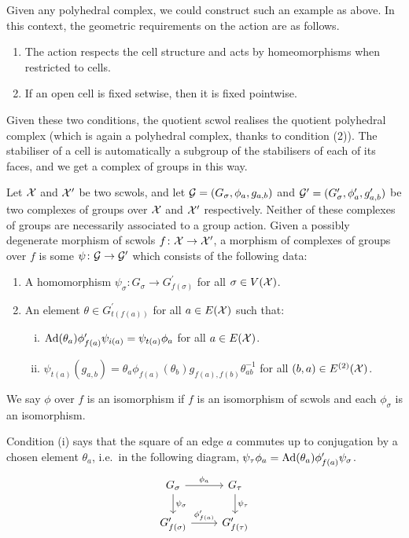 Given any polyhedral complex, we could construct such an example as above.
In this context, the geometric requirements on the action are as follows.
\begin{enumerate}
	\item The action respects the cell structure and acts by homeomorphisms when restricted to cells.
	\item If an open cell is fixed setwise, then it is fixed pointwise.
\end{enumerate}
Given these two conditions, the quotient scwol realises the quotient polyhedral complex (which is again a polyhedral complex, thanks to condition (2)).
The stabiliser of a cell is automatically a subgroup of the stabilisers of each of its faces, and we get a complex of groups in this way.

\begin{definition}
	Let $\mathcal{X}$ and $\mathcal{X}^\prime$ be two scwols, and let $\mathcal{G} = (G_\sigma, \phi_a, g_{a,b})$ and  $\mathcal{G}^\prime = (G^\prime_\sigma, \phi^\prime_a, g^\prime_{a,b})$ be two complexes of groups over $\mathcal{X}$ and $\mathcal{X}^\prime$ respectively.
	Neither of these complexes of groups are necessarily associated to a group action.
	Given a possibly degenerate morphism of scwols $f \colon \mathcal{X} \to \mathcal{X}^\prime$, a morphism of complexes of groups over $f$ is some $\psi  \colon \mathcal{G} \to \mathcal{G}^\prime$ which consists of the following data:
	\begin{enumerate}
		\item A homomorphism $\psi_\sigma \colon G_\sigma \to G^\prime_{f(\sigma)}$ for all $\sigma \in V(\mathcal{X}) $.
		\item An element $\theta \in G^\prime_{t(f(a))}$ for all $a \in E(\mathcal{X})$ such that:
		      \begin{enumerate}[(i)]
			      \item $\operatorname{Ad}(\theta_a)\phi'_{f(a)}\psi_{i(a)}=\psi_{t(a)}\phi_a$ for all $a \in E(\mathcal{X})$.
			      \item $\psi_{t(a)}(g_{a,b}) = \theta_a\phi_{f(a)}(\theta_b)g_{f(a),f(b)}\theta_{ab}^{-1}$ for all $(b,a) \in E^{(2)}(\mathcal{X})$.
		      \end{enumerate}
	\end{enumerate}
	We say $\phi$ over $f$ is an isomorphism if $f$ is an isomorphism of scwols and each $\phi_\sigma$ is an isomorphism.
	\label{def:morhpism_of_complexes_of_groups}
\end{definition}

Condition (i) says that the square of an edge $a$ commutes up to conjugation by a chosen element $\theta_a$, i.e.~in the following diagram, $\psi_\tau \phi_a = \operatorname{Ad}(\theta_a) \phi^\prime_{f(a)} \psi_\sigma$.
\begin{equation}
	\begin{tikzcd}
		G_\sigma \ar[d, "\psi_\sigma"] \ar[r, "\phi_a"] & G_\tau \ar[d, "\psi_\tau"]\\
		G^\prime_{f(\sigma)} \ar[r, "\phi^\prime_{f(a)}"] & G^\prime_{f(\tau)}
	\end{tikzcd}
	\label{eq:commuativity_sq_cx_morphism}
\end{equation}


